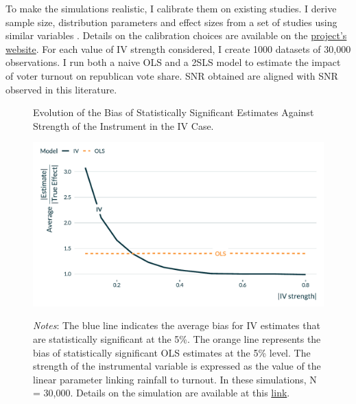 \documentclass[usletter, 12pt]{article}
\begin{document}
        			To make the simulations realistic, I calibrate them on existing studies. I derive sample size, distribution parameters and effect sizes from a set of studies using similar variables \citep{gomez_republicans_2007, fujiwara_habit_2016, cooperman_randomization_2017}. Details on the calibration choices are available on the \href{https://vincentbagilet.github.io/causal_exaggeration/IV.html#calibration-and-baseline-parameters-values}{project's website}. For each value of IV strength considered, I create 1000 datasets of 30,000 observations. I run both a naive OLS and a 2SLS model to estimate the impact of voter turnout on republican vote share. SNR obtained are aligned with SNR observed in this literature.
        			
        		
                    		 \begin{figure}[!h] 
                    			\begin{center}
                    				\caption{Evolution of the Bias of Statistically Significant Estimates Against Strength of the Instrument in the IV Case.}
                    				\label{graph_IV}
                    				\includegraphics[width=0.8\linewidth]{images/main_graph_IV_paper_annotated.pdf}
                                    \caption*{\footnotesize \textit{Notes}: The blue line indicates the average bias for IV estimates that are statistically significant at the 5\%. The orange line represents the bias of statistically significant OLS estimates at the 5\% level. The strength of the instrumental variable is expressed as the value of the linear parameter linking rainfall to turnout. In these simulations, N = 30,000. Details on the simulation are available at this \href{https://vincentbagilet.github.io/causal_exaggeration/IV.html}{link}.}
                                    \end{center}
				\vspace{-1cm}
                    		\end{figure} 
		
\end{document}
